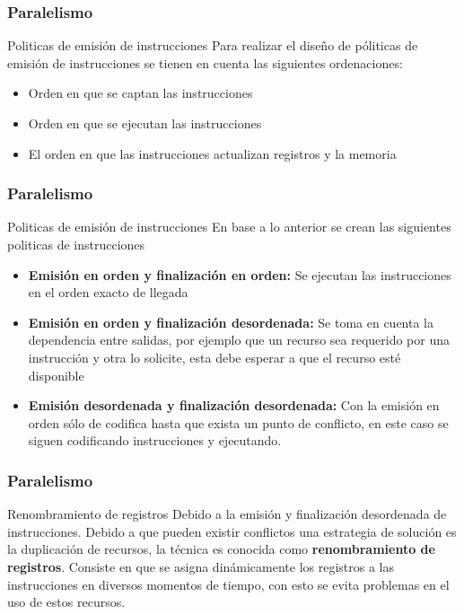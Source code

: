 \documentclass{beamer}
\begin{document}
\begin{frame}
	\frametitle{Paralelismo}
	\begin{block}{Politicas de emisión de instrucciones}
	Para realizar el diseño de póliticas de emisión de instrucciones se tienen en cuenta las siguientes ordenaciones:
	\begin{itemize}
		\item Orden en que se captan las instrucciones
		\item Orden en que se ejecutan las instrucciones
		\item El orden en que las instrucciones actualizan registros y la memoria
	\end{itemize}
	\end{block}		 		
\end{frame}

\begin{frame}
	\frametitle{Paralelismo}
	\begin{block}{Politicas de emisión de instrucciones}
	En base a lo anterior se crean las siguientes politicas de instrucciones
	\begin{itemize}
		\item \textbf{Emisión en orden y finalización en orden:} Se ejecutan las instrucciones en el orden exacto de llegada
		\item \textbf{Emisión en orden y finalización desordenada:} Se toma en cuenta la dependencia entre salidas, por ejemplo que un recurso sea requerido por una instrucción y otra lo solicite, esta debe esperar a que el recurso esté disponible
		\item \textbf{Emisión desordenada y finalización desordenada:} Con la emisión en orden sólo de codifica hasta que exista un punto de conflicto, en este caso se siguen codificando instrucciones y ejecutando.
	\end{itemize}
	\end{block}		 		
\end{frame}

\begin{frame}
	\frametitle{Paralelismo}
	\begin{block}{Renombramiento de registros}
	Debido a la emisión y finalización desordenada de instrucciones. Debido a que pueden existir conflictos una estrategia de solución es la duplicación de recursos, la técnica es conocida como \textbf{renombramiento de registros}. Consiste en que se asigna dinámicamente los registros a las instrucciones en diversos momentos de tiempo, con esto se evita problemas en el uso de estos recursos.
	\end{block}		 		
\end{frame}
\end{document}
